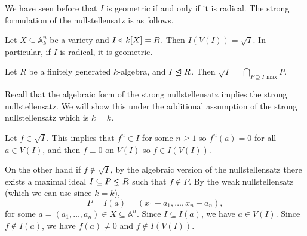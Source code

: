 \documentclass[11pt,a4paper]{article}
\newcommand{\A}{\mathbb A}
\begin{document}
\begin{remark}
  We have seen before that $I$ is geometric if and only if it is radical.
  The strong formulation of the nullstellensatz is as follows.
\end{remark}

\begin{theorem}
  \label{thm:null-algebraic-form}
  Let $X \subseteq \A_k^n$ be a variety and $I \triangleleft\, k[X] = R$.
  Then $I(V(I)) = \sqrt{I}$.
  In particular, if $I$ is radical, it is geometric.
\end{theorem}

\begin{theorem}
  Let $R$ be a finitely generated $k$-algebra,
  and $I \properideal R$.
  Then $\sqrt{I} = \bigcap_{P \supseteq I \text{ max}} P$.
\end{theorem}
\begin{remark}
  Recall that the algebraic form of the strong nullstellensatz
  implies the strong nullstellensatz.
  We will show this under the additional assumption
  of the strong nullstellensatz which is $k = \overline k$.

  Let $f \in \sqrt{I}$.
  This implies that $f^n \in I$ for some $n \geq 1$ so
  $f^n(a) = 0$ for all $a \in V(I)$,
  and then $f \equiv 0$ on $V(I)$ so $f \in I(V(I))$.

  On the other hand if $f \notin \sqrt{I}$,
  by the algebraic version of the nullstellensatz there exists
  a maximal ideal $I \subseteq P \properideal R$
  such that $f \notin P$.
  By the weak nullstellensatz (which we can use since $k = \overline k$),
  \[
    P = I(a) = (x_1 - a_1,\dots,x_n - a_n),
  \]
  for some $a = (a_1,\dots,a_n) \in X \subseteq \A^n$.
  Since $I \subseteq I(a)$, we have $a \in V(I)$.
  Since $f \notin I(a)$, we have $f(a) \neq 0$
  and $f \notin I(V(I))$.
\end{remark}
\end{document}
